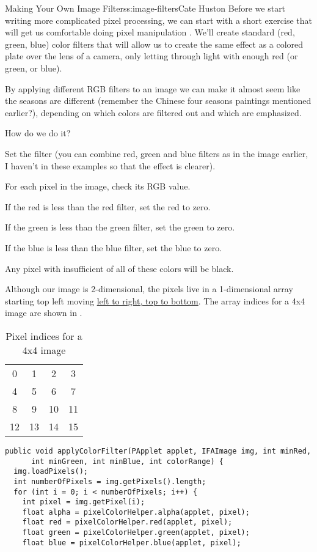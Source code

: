 \begin{aosachapter}{Making Your Own Image Filters}{s:image-filters}{Cate Huston}
Before we start writing more complicated pixel processing, we can start
with a short exercise that will get us comfortable doing pixel
manipulation . We'll create standard (red, green, blue) color filters
that will allow us to create the same effect as a colored plate over the
lens of a camera, only letting through light with enough red (or green,
or blue).

By applying different RGB filters to an image we can make it almost seem
like the seasons are different (remember the Chinese four seasons
paintings mentioned earlier?), depending on which colors are filtered
out and which are emphasized.

How do we do it?

\begin{aosaitemize}
\item
  Set the filter (you can combine red, green and blue filters as in the
  image earlier, I haven't in these examples so that the effect is
  clearer).
\item
  For each pixel in the image, check its RGB value.
\item
  If the red is less than the red filter, set the red to zero.
\item
  If the green is less than the green filter, set the green to zero.
\item
  If the blue is less than the blue filter, set the blue to zero.
\item
  Any pixel with insufficient of all of these colors will be black.
\end{aosaitemize}

Although our image is 2-dimensional, the pixels live in a 1-dimensional
array starting top left moving
\href{https://processing.org/tutorials/pixels/}{left to right, top to
bottom}. The array indices for a 4x4 image are shown in .

\begin{table}
\centering
{\footnotesize
{}
\begin{tabular}{cccc}
\hline
0 & 1 & 2 & 3 \\
4 & 5 & 6 & 7 \\
8 & 9 & 10 & 11 \\
12 & 13 & 14 & 15 \\
\hline
\end{tabular}
}
\caption{Pixel indices for a 4x4 image}
\label{500l.imagefilters.pixelindices}
\end{table}

\begin{verbatim}
public void applyColorFilter(PApplet applet, IFAImage img, int minRed,
      int minGreen, int minBlue, int colorRange) {  
  img.loadPixels();
  int numberOfPixels = img.getPixels().length;
  for (int i = 0; i < numberOfPixels; i++) {
    int pixel = img.getPixel(i);
    float alpha = pixelColorHelper.alpha(applet, pixel);
    float red = pixelColorHelper.red(applet, pixel);
    float green = pixelColorHelper.green(applet, pixel);
    float blue = pixelColorHelper.blue(applet, pixel);
      

\end{verbatim}
\end{aosachapter}
